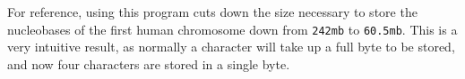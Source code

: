 For reference, using this program cuts down the size necessary to store the nucleobases of the first human chromosome down from \texttt{242mb} to \texttt{60.5mb}. This is a very intuitive result, as normally a character will take up a full byte to be stored, and now four characters are stored in a single byte.
